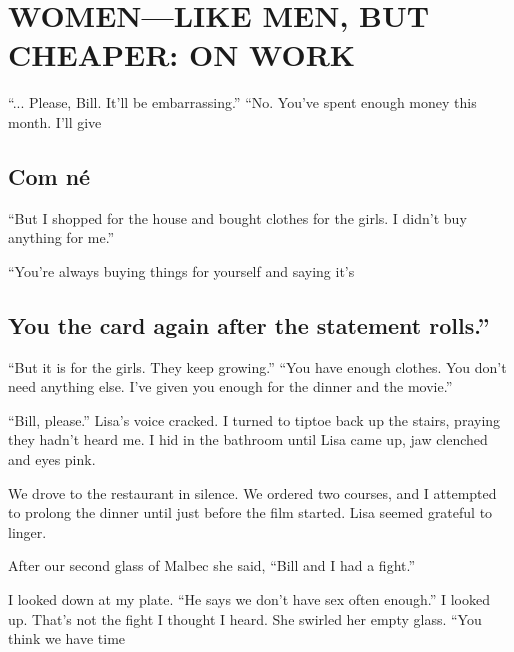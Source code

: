 \chapter{WOMEN—LIKE MEN, BUT CHEAPER: ON WORK}\label{WOMEN—LIKE MEN, BUT CHEAPER: ON WORK}
 \par 
“... Please, Bill. It'll be embarrassing.” “No. You've spent enough money this month. I'll give
 \par 
\section{Com né}
 \par 
“But I shopped for the house and bought clothes for the girls. I didn’t buy anything for me.”
 \par 
“You're always buying things for yourself and saying it’s
 \par 
\section{You the card again after the statement rolls.”}
 \par 
“But it is for the girls. They keep growing.” “You have enough clothes. You don’t need anything else. I’ve given you enough for the dinner and the movie.”
 \par 
“Bill, please.” Lisa’s voice cracked. I turned to tiptoe back up the stairs, praying they hadn't heard me. I hid in the bathroom until Lisa came up, jaw clenched and eyes pink.
 \par 
We drove to the restaurant in silence. We ordered two courses, and I attempted to prolong the dinner until just before the film started. Lisa seemed grateful to linger.
 \par 
After our second glass of Malbec she said, “Bill and I had a fight.”
 \par 
I looked down at my plate. “He says we don’t have sex often enough.” I looked up. That’s not the fight I thought I heard. She swirled her empty glass. “You think we have time
 \par 

